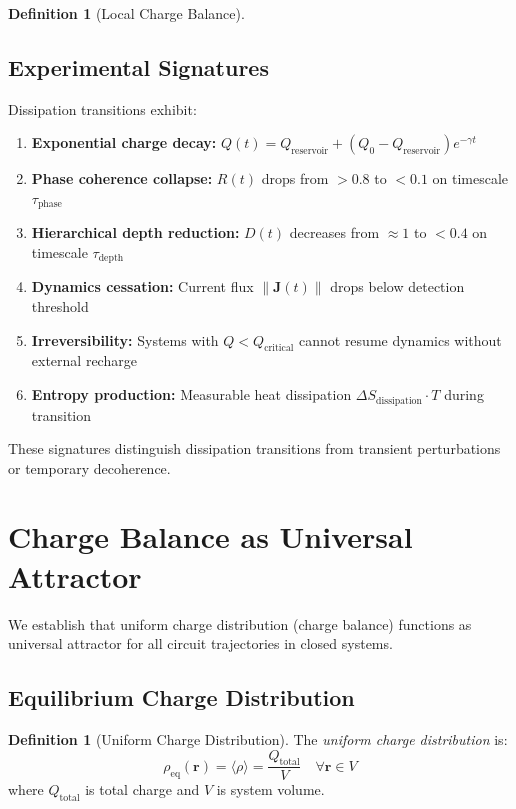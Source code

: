 \documentclass[12pt,a4paper]{article}
\theoremstyle{plain}
\theoremstyle{definition}
\newtheorem{definition}[theorem]{Definition}
\theoremstyle{remark}
\begin{document}
\begin{definition}[Local Charge Balance]
\subsection{Experimental Signatures}

Dissipation transitions exhibit:

\begin{enumerate}
\item \textbf{Exponential charge decay:} $Q(t) = Q_{\text{reservoir}} + (Q_0 - Q_{\text{reservoir}}) e^{-\gamma t}$

\item \textbf{Phase coherence collapse:} $R(t)$ drops from $> 0.8$ to $< 0.1$ on timescale $\tau_{\text{phase}}$

\item \textbf{Hierarchical depth reduction:} $D(t)$ decreases from $\approx 1$ to $< 0.4$ on timescale $\tau_{\text{depth}}$

\item \textbf{Dynamics cessation:} Current flux $\|\mathbf{J}(t)\|$ drops below detection threshold

\item \textbf{Irreversibility:} Systems with $Q < Q_{\text{critical}}$ cannot resume dynamics without external recharge

\item \textbf{Entropy production:} Measurable heat dissipation $\Delta S_{\text{dissipation}} \cdot T$ during transition
\end{enumerate}

These signatures distinguish dissipation transitions from transient perturbations or temporary decoherence.
\section{Charge Balance as Universal Attractor}
\label{sec:charge_attractor}

We establish that uniform charge distribution (charge balance) functions as universal attractor for all circuit trajectories in closed systems.

\subsection{Equilibrium Charge Distribution}

\begin{definition}[Uniform Charge Distribution]
\label{def:uniform_distribution}
The \emph{uniform charge distribution} is:
\begin{equation}
\rho_{\text{eq}}(\mathbf{r}) = \langle \rho \rangle = \frac{Q_{\text{total}}}{V} \quad \forall \mathbf{r} \in V
\end{equation}
where $Q_{\text{total}}$ is total charge and $V$ is system volume.
\end{definition}


\end{definition}
\end{document}
